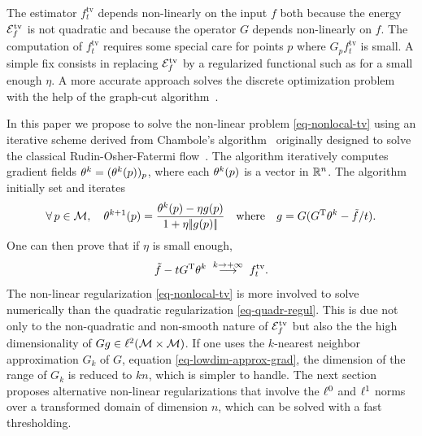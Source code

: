 \documentclass[final]{siamltex}
\newcommand{\tv}{\text{tv}}
\newcommand{\F}{f}
\newcommand{\tF}{\tilde \F}
\begin{document}
The estimator $\F_t^{\tv}$ depends non-linearly on the input $\F$ both because the energy $\energy_{\F}^{\tv}$ is not quadratic and because the operator $G$ depends non-linearly on $\F$.
The computation of $\F_t^{\tv}$ requires some special care for points $p$ where $G_p \F_t^{\tv}$ is small. A simple fix consists in replacing $\energy_{\F}^{\tv}$ by a regularized functional such as
\eq{
	\energy_{\F}^{\tv,\eta}(g) = 
	\sum_{p \in \Mm} (\eta^2 + \sum_q \abs{ (G g)(p,q)}^2)^{1/2}
} 
for a small enough $\eta$. A more accurate approach solves the discrete optimization problem with the help of the graph-cut algorithm~\cite{gilboa-nonlocal-functionals}.

In this paper we propose to solve the non-linear problem \eqref{eq-nonlocal-tv} using an iterative scheme derived from Chambole's algorithm~\cite{chambolle-algo-tv} originally designed to solve the classical Rudin-Osher-Fatermi flow~\cite{rudin-tv}. The algorithm iteratively computes gradient fields $\theta^k = (\theta^k(p))_p$, where each $\theta^k(p)$ is a vector in $\mathbb{R}^n$. The algorithm initially set 
and iterates
\begin{equation*}
	\foralls p \in \Mm, \quad
	\th^{k+1}(p) = \frac{ \th^k(p) - \eta g(p) }{1+\eta \norm{g(p)}}
	\qwhereq
	g = G ( \transp{G} \th^k - \tF/t ).
\end{equation*}
One can then prove \cite{chambolle-algo-tv} that if $\eta$ is small enough, 
\begin{equation*}
	\tF-t\transp{G} \th^k 
	\;\overset{k \rightarrow +\infty}{\longrightarrow}\;
	\F_t^{\tv}.
\end{equation*}
The non-linear regularization \eqref{eq-nonlocal-tv} is more involved to solve numerically than the quadratic regularization \eqref{eq-quadr-regul}. This is due not only to the non-quadratic and non-smooth nature of $\energy_{\F}^{\tv}$ but also the the high dimensionality of $G g \in \ell^2(\mathcal{M} \times \mathcal{M})$. If one uses the $k$-nearest neighbor approximation $G_k$ of $G$, equation \eqref{eq-lowdim-approx-grad}, the dimension of the range of $G_k$ is reduced to $k n$, which is simpler to handle. The next section proposes alternative non-linear regularizations that involve the $\ell^0$ and $\ell^1$ norms over a transformed domain of dimension $n$, which can be solved with a fast thresholding.


\end{document}
